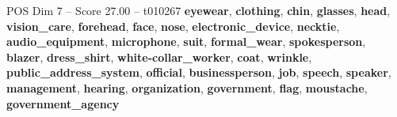 \begin{textsample}{POS Dim 7 – Score 27.00 – t010267}  \label{ex:f7_pos_032}
\textbf{eyewear}, \textbf{clothing}, \textbf{chin}, \textbf{glasses}, \textbf{head}, \textbf{vision\_care}, \textbf{forehead}, \textbf{face}, \textbf{nose}, \textbf{electronic\_device}, \textbf{necktie}, \textbf{audio\_equipment}, \textbf{microphone}, \textbf{suit}, \textbf{formal\_wear}, \textbf{spokesperson}, \textbf{blazer}, \textbf{dress\_shirt}, \textbf{white-collar\_worker}, \textbf{coat}, \textbf{wrinkle}, \textbf{public\_address\_system}, \textbf{official}, \textbf{businessperson}, \textbf{job}, \textbf{speech}, \textbf{speaker}, \textbf{management}, \textbf{hearing}, \textbf{organization}, \textbf{government}, \textbf{flag}, \textbf{moustache}, \textbf{government\_agency}

\end{textsample}
